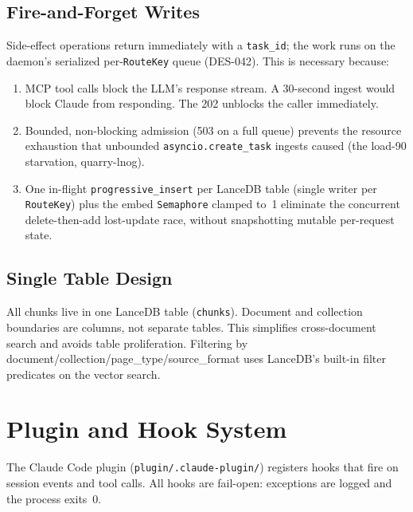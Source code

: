 \documentclass[a4paper,10pt]{article}
\newcommand{\field}[1]{\texttt{#1}}
\begin{document}
\subsection{Fire-and-Forget Writes}

Side-effect operations return immediately with a \field{task\_id}; the
work runs on the daemon's serialized per-\texttt{RouteKey} queue
(DES-042).  This is necessary because:

\begin{enumerate}
  \item MCP tool calls block the LLM's response stream.  A 30-second
    ingest would block Claude from responding.  The 202 unblocks the
    caller immediately.
  \item Bounded, non-blocking admission (503 on a full queue) prevents
    the resource exhaustion that unbounded \texttt{asyncio.create\_task}
    ingests caused (the load-90 starvation, quarry-lnog).
  \item One in-flight \texttt{progressive\_insert} per LanceDB table
    (single writer per \texttt{RouteKey}) plus the embed
    \texttt{Semaphore} clamped to~1 eliminate the concurrent
    delete-then-add lost-update race, without snapshotting mutable
    per-request state.
\end{enumerate}

\subsection{Single Table Design}

All chunks live in one LanceDB table (\texttt{chunks}).  Document and
collection boundaries are columns, not separate tables.  This
simplifies cross-document search and avoids table proliferation.
Filtering by document/collection/page\_type/source\_format uses
LanceDB's built-in filter predicates on the vector search.

\section{Plugin and Hook System}

The Claude Code plugin (\texttt{plugin/.claude-plugin/}) registers hooks
that fire on session events and tool calls.  All hooks are fail-open:
exceptions are logged and the process exits~0.
\end{document}
